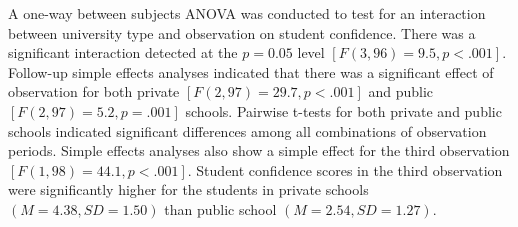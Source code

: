 \documentclass[onecolumn,10pt]{jhwhw}
\begin{document}
A one-way between subjects ANOVA was conducted to test for an interaction between university type and observation on student confidence. There was a significant interaction detected at the $p=0.05$ level $[F(3, 96)=9.5, p <.001]$. Follow-up simple effects analyses indicated that there was a significant effect of observation for both private $[F(2, 97)=29.7, p <.001]$ and public $[F(2, 97)=5.2, p =.001]$ schools. Pairwise t-tests for both private and public schools indicated significant differences among all combinations of observation periods. Simple effects analyses also show a simple effect for the third observation $[F(1, 98)=44.1, p <.001]$. Student confidence scores in the third observation were significantly higher for the students in private schools $(M=4.38, SD=1.50)$ than public school $(M=2.54, SD=1.27)$.






\end{document}

